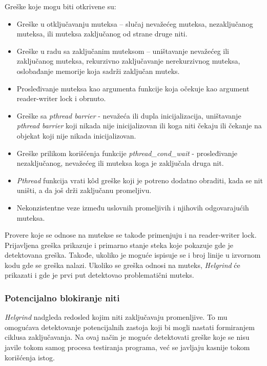 \documentclass[12pt,oneside]{memoir}
\theoremstyle{plain}
\theoremstyle{definition}
\begin{document}
Greške koje mogu biti otkrivene su:
\begin{itemize}
\item Greške u otključavanju muteksa – slučaj nevažećeg muteksa, nezaključanog muteksa, ili muteksa zaključanog od strane druge niti.
\item Greške u radu sa zaključanim muteksom – uništavanje nevažećeg ili zaključanog muteksa, rekurzivno zaključavanje nerekurzivnog muteksa, oslobađanje memorije koja sadrži zaključan muteks.
\item Prosleđivanje muteksa kao argumenta funkcije koja očekuje kao argument reader-writer lock i obrnuto.
\item Greške sa \textit{pthread barrier} - nevažeća ili dupla inicijalizacija, uništavanje \textit{pthread barrier} koji nikada nije inicijalizovan ili koga niti čekaju ili čekanje na objekat koji nije nikada inicijalizovan.
\item Greške prilikom korišćenja funkcije \textit{pthread\_cond\_wait} - prosleđivanje nezaključanog, nevažećeg ili muteksa koga je zaključala druga nit.
\item \textit{Pthread} funkcija vrati k\^od greške koji je potreno dodatno obraditi, kada se nit uništi, a da još drži zaključanu promeljivu.
\item Nekonzistentne veze između uslovnih promeljivih i njihovih odgovarajućih muteksa.
\end{itemize}

Provere koje se odnose na mutekse se takođe primenjuju i na reader-writer lock. Prijavljena greška prikazuje i primarno stanje steka koje pokazuje gde je detektovana greška. Takođe, ukoliko je moguće ispisuje se i broj linije u izvornom  kodu gde se greška nalazi. Ukoliko se greška odnosi na muteks, \textit{Helgrind} će prikazati i gde je prvi put detektovao problematični muteks.


\subsubsection{Potencijalno blokiranje niti}
\textit{Helgrind} nadgleda redosled kojim niti zaključavaju promenljive. To mu omogućava detektovanje potencijalnih zastoja koji bi mogli nastati formiranjem ciklusa zaključavanja. Na ovaj način je moguće detektovati greške koje se nisu javile tokom samog procesa testiranja programa, već se javljaju kasnije tokom korišćenja istog.
\end{document}
